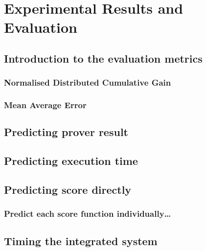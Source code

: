 \chapter{Experimental Results and Evaluation}%

\label{Results} %

\section{Introduction to the evaluation metrics}
\subsection{Normalised Distributed Cumulative Gain}
\subsection{Mean Average Error}
\section{Predicting prover result}
\section{Predicting execution time}
\section{Predicting score directly}
\subsection{Predict each score function individually\dots}
\section{Timing the integrated system}
